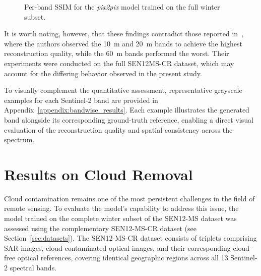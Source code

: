 \begin{figure}[h!]
\centering
{}
\caption[Per-band SSIM for the Pix2Pix model]{Per-band SSIM for the \textit{pix2pix} model trained on the full winter subset.}
\label{fig:ssim_per_band}
\end{figure}

It is worth noting, however, that these findings contradict those reported in~\cite{CR_SEN2_dRNN}, where the authors observed the 10~m and 20~m bands to achieve the highest reconstruction quality, while the 60~m bands performed the worst. Their experiments were conducted on the full SEN12MS-CR dataset, which may account for the differing behavior observed in the present study.

To visually complement the quantitative assessment, representative grayscale examples for each Sentinel-2 band are provided in Appendix~\ref{appendix:bandwise_results}. Each example illustrates the generated band alongside its corresponding ground-truth reference, enabling a direct visual evaluation of the reconstruction quality and spatial consistency across the spectrum.

\newpage

\section{Results on Cloud Removal}
\label{sec:cloud_removal}
Cloud contamination remains one of the most persistent challenges in the field of remote sensing. To evaluate the model’s capability to address this issue, the model trained on the complete winter subset of the SEN12-MS dataset was assessed using the complementary SEN12-MS-CR dataset (see Section~\ref{sec:datasets}). The SEN12-MS-CR dataset consists of triplets comprising SAR images, cloud-contaminated optical images, and their corresponding cloud-free optical references, covering identical geographic regions across all 13 Sentinel-2 spectral bands.

